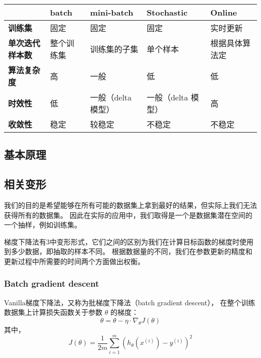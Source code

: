 \begin{table}[H]
    \begin{tabular}{|l|l|l|l|l|}
        \hline
                                & \textbf{batch} & \textbf{mini-batch} & \textbf{Stochastic} & \textbf{Online} \\
        \hline
        \textbf{训练集}         & 固定       & 固定               & 固定               & 实时更新 \\
        \hline
        \textbf{单次迭代样本数} & 整个训练集 & 训练集的子集       & 单个样本           & 根据具体算法定 \\
        \hline
        \textbf{算法复杂度}     & 高         & 一般               & 低                 & 低 \\
        \hline
        \textbf{时效性}         & 低         & 一般（delta 模型） & 一般（delta 模型） & 高 \\
        \hline
        \textbf{收敛性}         & 稳定       & 较稳定             & 不稳定             & 不稳定 \\
        \hline
    \end{tabular}
\end{table}
        

\subsection{基本原理}

\subsection{相关变形}
我们的目的是希望能够在所有可能的数据集上拿到最好的结果，但实际上我们无法获得所有的数据集。
因此在实际的应用中，我们取得是一个是数据集潜在空间的一个抽样，例如训练集。

梯度下降法有3中变形形式，它们之间的区别为我们在计算目标函数的梯度时使用到多少数据，即抽取的样本不同。
根据数据量的不同，我们在参数更新的精度和更新过程中所需要的时间两个方面做出权衡。


\subsubsection{Batch gradient descent}
Vanilla梯度下降法，又称为批梯度下降法（batch gradient descent），
在整个训练数据集上计算损失函数关于参数 $\theta$ 的梯度：
\[
    \theta = \theta - \eta \cdot \nabla_{\theta}{J(\theta)}
\]
其中，
\[
    J(\theta)=\frac{1}{2m}{\sum_{i=1}^{m}{(h_{\theta}(x^{(i)}) - y^{(i)})^2}}
\]

